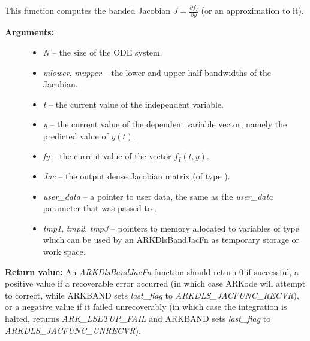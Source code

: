 \documentclass[letterpaper,10pt,english]{sphinxmanual}
\begin{document}
\begin{fulllineitems}
\label{c_interface/User_supplied:c.ARKDlsBandJacFn}
This function computes the banded Jacobian \(J =
\frac{\partial f_I}{\partial y}\) (or an approximation to it).
\begin{description}
\item[{\textbf{Arguments:}}] \leavevmode\begin{itemize}
\item {} 
\emph{N} -- the size of the ODE system.

\item {} 
\emph{mlower}, \emph{mupper} -- the lower and upper half-bandwidths of
the Jacobian.

\item {} 
\emph{t} -- the current value of the independent variable.

\item {} 
\emph{y} -- the current value of the dependent variable vector, namely
the predicted value of \(y(t)\).

\item {} 
\emph{fy} -- the current value of the vector \(f_I(t,y)\).

\item {} 
\emph{Jac} -- the output dense Jacobian matrix (of type ).

\item {} 
\emph{user\_data} -- a pointer to user data, the same as the
\emph{user\_data} parameter that was passed to {\hyperref[c_interface/User_callable:c.ARKodeSetUserData]{\emph{}}}.

\item {} 
\emph{tmp1}, \emph{tmp2}, \emph{tmp3} -- pointers to memory allocated to
variables of type  which can be used by an
ARKDlsBandJacFn as temporary storage or work space.

\end{itemize}

\end{description}

\textbf{Return value:}
An \emph{ARKDlsBandJacFn} function should return 0 if
successful, a positive value if a recoverable error occurred (in
which case ARKode will attempt to correct, while ARKBAND
sets \emph{last\_flag} to \emph{ARKDLS\_JACFUNC\_RECVR}), or a negative
value if it failed unrecoverably (in which case the integration is
halted, {\hyperref[c_interface/User_callable:c.ARKode]{\emph{}}} returns \emph{ARK\_LSETUP\_FAIL} and
ARKBAND sets \emph{last\_flag} to \emph{ARKDLS\_JACFUNC\_UNRECVR}).


\end{fulllineitems}
\end{document}

